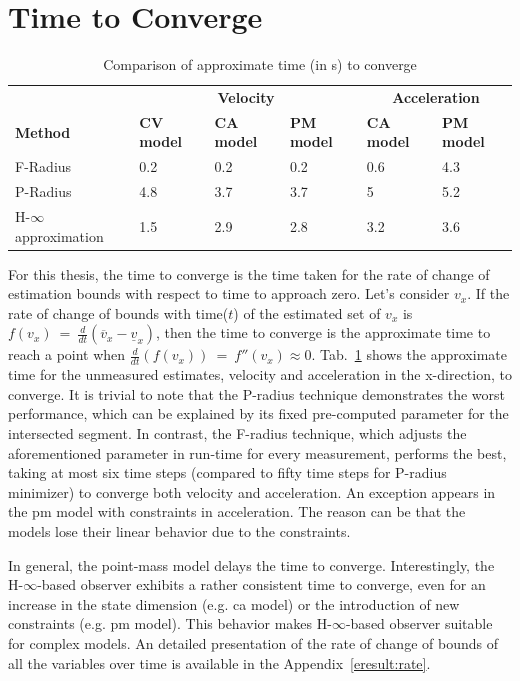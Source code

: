 \section{Time to Converge}
\begin{table}[!h]
\caption{Comparison of approximate time (in s) to converge}
	\centering
	\renewcommand{\arraystretch}{1.1}
	\small	
	\begin{tabular}{l l l l l l}
		\toprule 
		
		& \multicolumn{3}{c}{\textbf{Velocity}} & \multicolumn{2}{c}{\textbf{Acceleration}}\\ \cmidrule(l){2-4} \cmidrule(l){5-6}
		\textbf{Method} & \textbf{CV model} & \textbf{CA model} & \textbf{PM model} & \textbf{CA model} & \textbf{PM model}\\ \midrule
		F-Radius & 0.2 & 0.2 & 0.2 & 0.6 & 4.3\\
		P-Radius & 4.8 & 3.7 & 3.7 & 5 & 5.2 \\
		H-$\infty$ approximation & 1.5 & 2.9 & 2.8 & 3.2 & 3.6\\
		\bottomrule
	\end{tabular}
	\label{tab:convtime}
\end{table}
For this thesis, the time to converge is the time taken for the rate of change of estimation bounds with respect to time to approach zero. Let's consider $v_x$. If the rate of change of bounds with time($t$) of the estimated set of $v_x$ is $f(v_x)~=~\frac{d}{dt} (\overline{v}_x - \underline{v}_x)$, then the time to converge is the approximate time to reach a point when ${\frac{d}{dt}(f(v_x))~=~f''(v_x) \approx 0}$.  Tab.~\ref{tab:convtime} shows the approximate time for the unmeasured estimates, velocity and acceleration in the x-direction, to converge. It is trivial to note that the P-radius technique demonstrates the worst performance, which can be explained by its fixed pre-computed parameter for the intersected segment. In contrast, the F-radius technique, which adjusts the aforementioned parameter in run-time for every measurement, performs the best, taking at most six time steps (compared to fifty time steps for P-radius minimizer) to converge both velocity and acceleration. An exception appears in the pm model with constraints in acceleration. The reason can be that the models lose their linear behavior due to the constraints. 

In general, the point-mass model delays the time to converge. Interestingly, the H-$\infty$-based observer exhibits a rather consistent time to converge, even for an increase in the state dimension (e.g. ca model) or the introduction of new constraints (e.g. pm model). This behavior makes H-$\infty$-based observer suitable for complex models. An detailed presentation of the rate of change of bounds of all the variables over time is available in the Appendix~\ref{eresult:rate}. 

